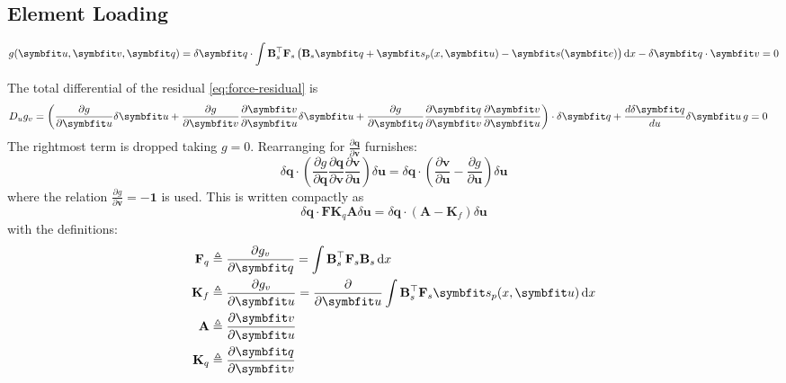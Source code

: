 \subsection{Element Loading}

\begin{equation}
    g(\bm{u},\bm{v},\bm{q}) = \delta \bm{q} \cdot \int \ForceInterp^{\top}\mathbf{F}_{s}\,\bigl(\ForceInterp\bm{q} + \bm{s}_{p}(x,\bm{u}) - \bm{s}(\bm{e})\bigr)\, \dd x - \delta \bm{q} \cdot \bm{v} = 0
    \label{eq:force-residual}
\end{equation}

The total differential of the residual \eqref{eq:force-residual} is
\begin{equation*}
\begin{aligned}
& D_{u} \gv 
=\left(
\frac{\partial g}{\partial \bm{u}} \delta \bm{u}+\frac{\partial g}{\partial \bm{v}} \frac{\partial \bm{v}}{\partial \bm{u}} \delta \bm{u} + \frac{\partial g}{\partial \bm{q}} \frac{\partial \bm{q}}{\partial \bm{v}} \frac{\partial \bm{v}}{\partial \bm{u}}\right) \cdot \delta \bm{q}
+\frac{d \delta \bm{q}}{d u} \delta \bm{u} \, g = 0
\end{aligned}
\end{equation*}
The rightmost term is dropped taking \(g = 0\). 
Rearranging for \(\frac{\partial \bm{q}}{\partial \bm{v}}\) furnishes:
\begin{equation}
\delta \bm{q} \cdot \left(
\frac{\partial g}{\partial \bm{q}} \frac{\partial \bm{q}}{\partial \bm{v}}\frac{\partial \bm{v}}{\partial \bm{u}}
\right)\delta \bm{u}
= \delta \bm{q}\cdot \left( 
\frac{\partial \bm{v}}{\partial \bm{u}} - \frac{\partial g}{\partial \bm{u}}
\right)\delta \bm{u}
\label{eq:dqdv}
\end{equation}
where the relation \(\frac{\partial g}{\partial \bm{v}} = -\mathbf{1}\) is used. 
This is written compactly as
\begin{equation}
\delta \bm{q} \cdot 
\mathbf{F}\mathbf{K}_q \mathbf{A}
\delta \bm{u}
= \delta \bm{q}\cdot \left( 
\mathbf{A} - \mathbf{K}_{f}
\right)\delta \bm{u}
\label{eq:dqdv-2}
\end{equation}
with the definitions:
\begin{equation*}
\begin{aligned}
\mathbf{F}_q &\triangleq \frac{\partial \gv}{\partial \bm{q}} = \int \ForceInterp^{\top} \mathbf{F}_{s} \ForceInterp\, \dd x \\
\mathbf{K}_{f} &\triangleq \frac{\partial \gv}{\partial \bm{u}} =\frac{\partial }{\partial \bm{u}} \int \ForceInterp^{\top} \mathbf{F}_{s} \bm{s}_p(x,\bm{u})\,\dd x \\
\mathbf{A} & \triangleq \frac{\partial \bm{v}}{\partial \bm{u}} \\
\mathbf{K}_{q} &\triangleq \frac{\partial \bm{q}}{\partial \bm{v}} \\
\end{aligned}
\end{equation*}
